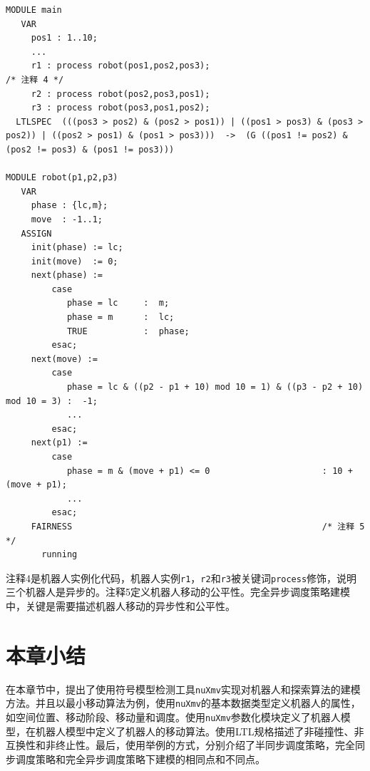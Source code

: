 \begin{lstlisting}
MODULE main
   VAR
     pos1 : 1..10;
     ...
     r1 : process robot(pos1,pos2,pos3);                              /* 注释 4 */
     r2 : process robot(pos2,pos3,pos1);
     r3 : process robot(pos3,pos1,pos2);
  LTLSPEC  (((pos3 > pos2) & (pos2 > pos1)) | ((pos1 > pos3) & (pos3 > pos2)) | ((pos2 > pos1) & (pos1 > pos3)))  ->  (G ((pos1 != pos2) & (pos2 != pos3) & (pos1 != pos3)))

MODULE robot(p1,p2,p3)
   VAR
     phase : {lc,m};
     move  : -1..1;
   ASSIGN
     init(phase) := lc;
     init(move)  := 0;
     next(phase) :=
         case
            phase = lc     :  m;
            phase = m      :  lc;
            TRUE           :  phase;
         esac;
     next(move) :=
         case
            phase = lc & ((p2 - p1 + 10) mod 10 = 1) & ((p3 - p2 + 10) mod 10 = 3) :  -1;
            ...
         esac;
     next(p1) :=
         case
            phase = m & (move + p1) <= 0                      : 10 + (move + p1);
            ...
         esac;
     FAIRNESS                                                 /* 注释 5 */
       running
\end{lstlisting}

注释4是机器人实例化代码，机器人实例\verb|r1|，\verb|r2|和\verb|r3|被关键词\verb|process|修饰，说明三个机器人是异步的。注释5定义机器人移动的公平性。完全异步调度策略建模中，关键是需要描述机器人移动的异步性和公平性。


\section{本章小结}
在本章节中，提出了使用符号模型检测工具\verb|nuXmv|实现对机器人和探索算法的建模方法。并且以最小移动算法为例，使用\verb|nuXmv|的基本数据类型定义机器人的属性，如空间位置、移动阶段、移动量和调度。使用\verb|nuXmv|参数化模块定义了机器人模型，在机器人模型中定义了机器人的移动算法。使用LTL规格描述了非碰撞性、非互换性和非终止性。最后，使用举例的方式，分别介绍了半同步调度策略，完全同步调度策略和完全异步调度策略下建模的相同点和不同点。
